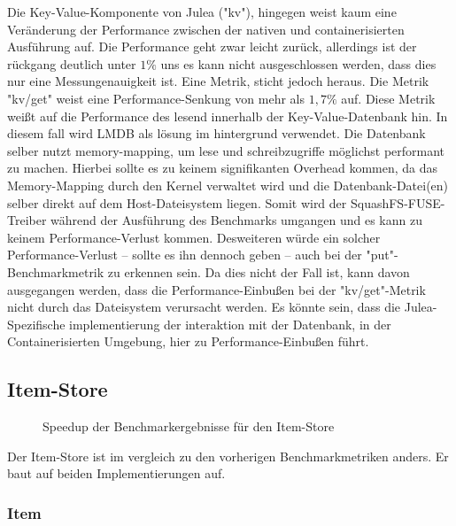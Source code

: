 Die Key-Value-Komponente von Julea ("kv"), hingegen weist kaum eine Veränderung der Performance zwischen der nativen und containerisierten Ausführung auf. Die Performance geht zwar leicht zurück, allerdings ist der rückgang deutlich unter $1\%$ uns es kann nicht ausgeschlossen werden, dass dies nur eine Messungenauigkeit ist. Eine Metrik, sticht jedoch heraus. Die Metrik "kv/get" weist eine Performance-Senkung von mehr als $1,7\%$ auf. Diese Metrik weißt auf die Performance des lesend innerhalb der Key-Value-Datenbank hin. In diesem fall wird LMDB als lösung im hintergrund verwendet. Die Datenbank selber nutzt memory-mapping, um lese und schreibzugriffe möglichst performant zu machen. Hierbei sollte es zu keinem signifikanten Overhead kommen, da das Memory-Mapping durch den Kernel verwaltet wird und die Datenbank-Datei(en) selber direkt auf dem Host-Dateisystem liegen. Somit wird der SquashFS-FUSE-Treiber während der Ausführung des Benchmarks umgangen und es kann zu keinem Performance-Verlust kommen. Desweiteren würde ein solcher Performance-Verlust – sollte es ihn dennoch geben – auch bei der "put"-Benchmarkmetrik zu erkennen sein. Da dies nicht der Fall ist, kann davon ausgegangen werden, dass die Performance-Einbußen bei der "kv/get"-Metrik nicht durch das Dateisystem verursacht werden. Es könnte sein, dass die Julea-Spezifische implementierung der interaktion mit der Datenbank, in der Containerisierten Umgebung, hier zu Performance-Einbußen führt. 

\subsection{Item-Store}

\begin{figure}
    \centering
    
    \caption{Speedup der Benchmarkergebnisse für den Item-Store}
    \label{fig:speedup_item}
\end{figure}

\FloatBarrier

Der Item-Store ist im vergleich zu den vorherigen Benchmarkmetriken anders. Er baut auf beiden Implementierungen auf.

\subsubsection{Item}

